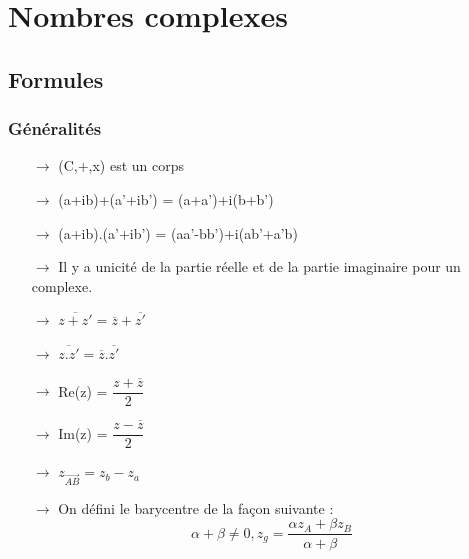 \chapter{Nombres complexes}
\section{Formules}
\subsection{Généralités}
\begin{itemize}
\item[{$\rightarrow$}] (C,+,x) est un corps
 \item[{$\rightarrow$}] (a+ib)+(a'+ib') = (a+a')+i(b+b')\\
 \item[{$\rightarrow$}] (a+ib).(a'+ib') = (aa'-bb')+i(ab'+a'b)\\
 \item[{$\rightarrow$}] Il y a unicité de la partie réelle et de la partie imaginaire pour un complexe.\\
 \item[{$\rightarrow$}]$\overline{z+z'}=\overline{z}+\overline{z'}$\\
 \item[{$\rightarrow$}]$\overline{z.z'}=\overline{z}.\overline{z'}$\\
 \item[{$\rightarrow$}]Re(z) = $\dfrac{z+\overline{z}}{2}$\\
\item[{$\rightarrow$}]Im(z) = $\dfrac{z-\overline{z}}{2}$\\
\item[{$\rightarrow$}]$z_{\overrightarrow{AB}} = z_b-z_a$ \\
\item[{$\rightarrow$}]On défini le barycentre de la façon suivante : $$\alpha + \beta \neq 0, z_g = \dfrac{\alpha z_A + \beta z_B}{\alpha + \beta}$$
\end{itemize}
